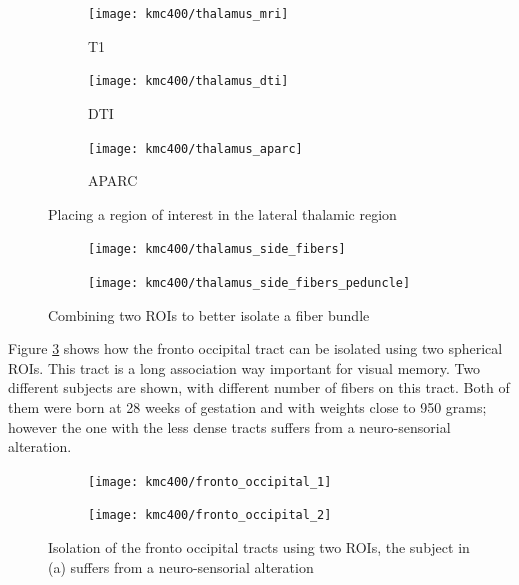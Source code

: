 \begin{figure}
\centering
	\begin{subfigure}{0.3\textwidth}
		\texttt{[image: kmc400/thalamus\_mri]}
		\caption{T1}
	\end{subfigure}\hfill
	\begin{subfigure}{0.3\textwidth}
\texttt{[image: kmc400/thalamus\_dti]}
		\caption{DTI}
	\end{subfigure}\hfill
	\begin{subfigure}{0.3\textwidth}
\texttt{[image: kmc400/thalamus\_aparc]}
		\caption{APARC}
	\end{subfigure}
\caption{Placing a region of interest in the lateral thalamic region
\label{fig_thalamus_seed}}
\end{figure}



\begin{figure}
\centering
	\begin{subfigure}{0.45\textwidth}
		\texttt{[image: kmc400/thalamus\_side\_fibers]}
		\caption{}
	\end{subfigure}\hfill
	\begin{subfigure}{0.45\textwidth}
\texttt{[image: kmc400/thalamus\_side\_fibers\_peduncle]}
		\caption{}
	\end{subfigure}
\caption{Combining two ROIs to better isolate a fiber bundle
\label{fig_thalamus_fibers}}
\end{figure}



Figure \ref{fig_fronto_occipital} shows how the fronto occipital tract can be isolated using two spherical ROIs. This tract is a long association way  important for visual memory. Two different subjects are shown, with different number of fibers on this tract. Both of them were born at 28 weeks of gestation and with weights close to 950 grams; however the one with the less dense tracts suffers from a neuro-sensorial alteration.

\begin{figure}
\centering
	\begin{subfigure}{0.45\textwidth}
		\texttt{[image: kmc400/fronto\_occipital\_1]}
		\caption{}
	\end{subfigure}\hfill
	\begin{subfigure}{0.45\textwidth}
\texttt{[image: kmc400/fronto\_occipital\_2]}
		\caption{}
	\end{subfigure}
\caption{Isolation of the fronto occipital tracts using two ROIs, the subject in (a) suffers from a neuro-sensorial alteration
\label{fig_fronto_occipital}}
\end{figure}


